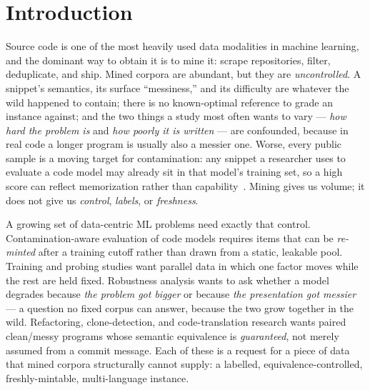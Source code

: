 
\section{Introduction}
\label{sec:intro}

Source code is one of the most heavily used data modalities in machine learning, and
the dominant way to obtain it is to mine it: scrape repositories, filter, deduplicate,
and ship. Mined corpora are abundant, but they are \emph{uncontrolled}. A snippet's
semantics, its surface ``messiness,'' and its difficulty are whatever the wild happened
to contain; there is no known-optimal reference to grade an instance against; and the
two things a study most often wants to vary --- \emph{how hard the problem is} and
\emph{how poorly it is written} --- are confounded, because in real code a longer
program is usually also a messier one. Worse, every public sample is a moving target for
contamination: any snippet a researcher uses to evaluate a code model may already sit in
that model's training set, so a high score can reflect memorization rather than
capability~\citep{jacovi2023stop,riddell2024quantifying}. Mining gives us volume; it does not give us
\emph{control}, \emph{labels}, or \emph{freshness}.

A growing set of data-centric ML problems need exactly that control. Contamination-aware
evaluation of code models requires items that can be \emph{re-minted} after a training
cutoff rather than drawn from a static, leakable pool. Training and probing studies want
parallel data in which one factor moves while the rest are held fixed. Robustness
analysis wants to ask whether a model degrades because \emph{the problem got bigger} or
because \emph{the presentation got messier} --- a question no fixed corpus can answer,
because the two grow together in the wild. Refactoring, clone-detection, and
code-translation research wants paired clean/messy programs whose semantic equivalence is
\emph{guaranteed}, not merely assumed from a commit message. Each of these is a request
for a piece of data that mined corpora structurally cannot supply: a labelled,
equivalence-controlled, freshly-mintable, multi-language instance.

